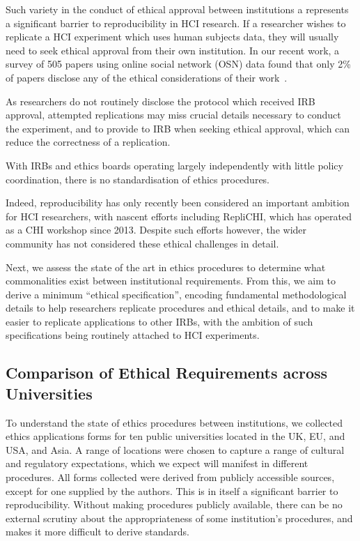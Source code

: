 Such variety in the conduct of ethical approval between institutions a
represents a significant barrier to reproducibility in HCI research.
If a researcher wishes to replicate a HCI experiment which uses human
subjects data, they will usually need to seek ethical approval from
their own institution. In our recent work, a survey of 505 papers
using online social network (OSN) data found that only 2\% of papers
disclose any of the ethical considerations of their
work~\cite{hutton:reproducibility}.


As researchers do not routinely disclose the protocol which
received IRB approval, attempted replications may miss crucial details
necessary to conduct the experiment, and to provide to IRB when seeking
ethical approval, which can reduce the correctness of a replication.

With IRBs and ethics boards operating largely independently with little policy
coordination, there is no standardisation of ethics procedures.

Indeed, reproducibility has only recently been considered an important
ambition for HCI researchers, with nascent efforts including RepliCHI, which
has operated as a CHI workshop since 2013. Despite such efforts however, the
wider community has not considered these ethical challenges in detail.

Next, we assess the state of the art in ethics procedures to determine what
commonalities exist between institutional requirements. From this, we aim to
derive a minimum ``ethical specification'', encoding fundamental
methodological details to help researchers replicate procedures and ethical
details, and to make it easier to replicate applications to other IRBs, with
the ambition of such specifications being routinely attached to HCI
experiments.


\subsection{Comparison of Ethical Requirements across Universities}

To understand the state of ethics procedures between institutions, we
collected ethics applications forms for ten public universities located in the
UK, EU, and USA, and Asia. A range of locations were chosen to capture a range of
cultural and regulatory expectations, which we expect will manifest in
different procedures. All forms collected were derived from publicly
accessible sources, except for one supplied by the authors. This is in
itself a significant barrier to reproducibility. Without making procedures publicly 
available, there can be no external scrutiny about the appropriateness of some institution's
procedures, and makes it more difficult to derive standards.

